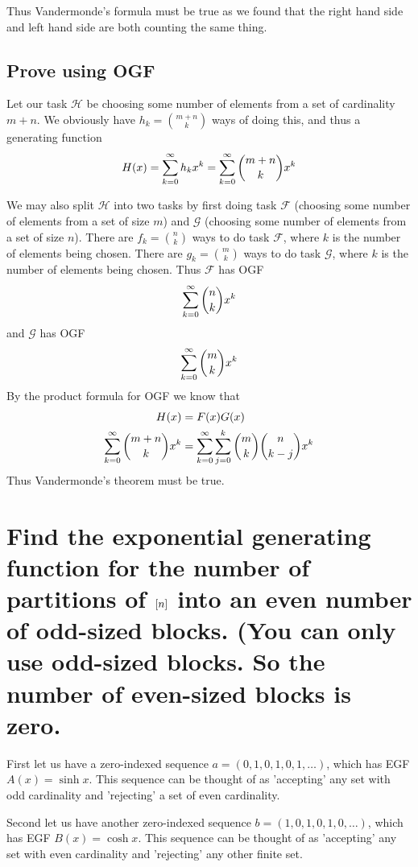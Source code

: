 \documentclass{article}
\theoremstyle{definition}
\begin{document}
	Thus Vandermonde's formula must be true as we found that the right hand side and left hand side are both counting the same thing.
	
	\subsection{Prove using OGF}
	
	Let our task $\mathcal{H}$ be choosing some number of elements from a set of cardinality $m+n$. We obviously have $h_k = \binom {m+n}k$ ways of doing this, and thus a generating function $$H(x) = \sum\limits_{k=0}^{\infty}  {h_kx^k}  = \sum\limits_{k=0}^{\infty}  {\binom{m+n}kx^k} $$
	
	We may also split $\mathcal H$ into two tasks by first doing task $\mathcal F$ (choosing some number of elements from a set of size $m$) and $\mathcal G$ (choosing some number of elements from a set of size $n$). There are $f_k = \binom nk$ ways to do task $\mathcal F$, where $k$ is the number of elements being chosen.  There are $g_k = \binom mk$ ways to do task $\mathcal G$, where $k$ is the number of elements being chosen. Thus $\mathcal F$ has OGF $$\sum\limits_{k=0}^{\infty}  {\binom nkx^k} $$ and $\mathcal G$ has OGF $$\sum\limits_{k=0}^{\infty}  {\binom mkx^k} $$ By the product formula for OGF we know that 
	\begin{align*}
		H(x) &= F(x)G(x) \\
		\sum\limits_{k=0}^{\infty}  {\binom{m+n}kx^k} 	&= \sum\limits_{k=0}^{\infty}  {\sum\limits_{j=0}^{k}  {\binom mk\binom n{k-j}}  x^k} 
	\end{align*}
	Thus Vandermonde's theorem must be true.
	
\section{Find the exponential generating function for the number of partitions of $\left[ n \right]$ into an even number of odd-sized blocks. (You can only use odd-sized blocks. So the number of even-sized blocks is zero.}


First let us have a zero-indexed sequence $a = (0,1,0,1,0,1,\ldots)$, which has EGF $A(x) = \sinh x$. This sequence can be thought of as 'accepting' any set with odd cardinality and 'rejecting' a set of even cardinality.

Second let us have another zero-indexed sequence $b = (1,0,1,0,1,0,\ldots)$, which has EGF $B(x) = \cosh x$. This sequence can be thought of as 'accepting' any set with even cardinality and 'rejecting' any other finite set.
\end{document}
